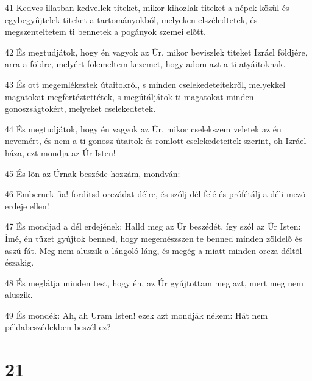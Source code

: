 \par 41 Kedves illatban kedvellek titeket, mikor kihozlak titeket a népek közül és egybegyûjtelek titeket a tartományokból, melyeken elszéledtetek, és megszenteltetem ti bennetek a pogányok szemei elõtt.
\par 42 És megtudjátok, hogy én vagyok az Úr, mikor beviszlek titeket Izráel földjére, arra a földre, melyért fölemeltem kezemet, hogy adom azt a ti atyáitoknak.
\par 43 És ott megemlékeztek útaitokról, s minden cselekedeteitekrõl, melyekkel magatokat megfertéztettétek, s megútáljátok ti magatokat minden gonoszságtokért, melyeket cselekedtetek.
\par 44 És megtudjátok, hogy én vagyok az Úr, mikor cselekszem veletek az én nevemért, és nem a ti gonosz útaitok és romlott cselekedeteitek szerint, oh Izráel háza, ezt mondja az Úr Isten!
\par 45 És lõn az Úrnak beszéde hozzám, mondván:
\par 46 Embernek fia! fordítsd orczádat délre, és szólj dél felé és prófétálj a déli mezõ erdeje ellen!
\par 47 És mondjad a dél erdejének: Halld meg az Úr beszédét, így szól az Úr Isten: Ímé, én tüzet gyújtok benned, hogy megemészszen te benned minden zöldelõ és aszú fát. Meg nem aluszik a lángoló láng, és megég a miatt minden orcza déltõl északig.
\par 48 És meglátja minden test, hogy én, az Úr gyújtottam meg azt, mert meg nem aluszik.
\par 49 És mondék: Ah, ah Uram Isten! ezek azt mondják nékem: Hát nem példabeszédekben beszél ez?

\chapter{21}

